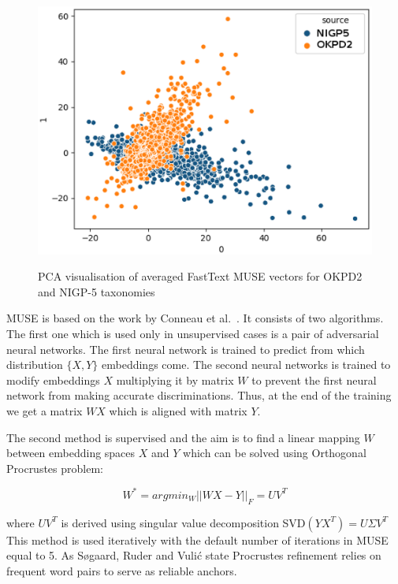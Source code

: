 \documentclass[11pt,a4paper]{article}
\begin{document}
\begin{figure}

	\centering
	\small
	\includegraphics[scale=0.5]{tsne_new}\\

	\caption{PCA visualisation of averaged FastText MUSE vectors for OKPD2 and NIGP-5 taxonomies}
	\label{original-doc2vec}
\end{figure}

MUSE is based on the work by Conneau et al.~\cite{muse}. It consists of two algorithms. The first one which is used only in unsupervised cases is a pair of adversarial neural networks. The first neural network is trained to predict from which distribution $\{X, Y\}$ embeddings come. The second neural networks is trained to modify embeddings $X$ multiplying it by matrix $W$ to prevent the first neural network from making accurate discriminations. Thus, at the end of the training we get a matrix $WX$ which is aligned with matrix $Y$.

The second method is supervised and the aim is to find a linear mapping $W$ between embedding spaces $X$ and $Y$ which can be solved using Orthogonal Procrustes problem:

$$ W^* = argmin_W ||WX - Y||_F = UV^T$$

where $UV^T$ is derived using singular value decomposition SVD$(YX^T) = U \Sigma V^T$
This method is used iteratively with the default number of iterations in MUSE equal to 5. As Søgaard, Ruder and Vulić state Procrustes refinement relies on frequent word pairs to serve as reliable anchors.
\end{document}
